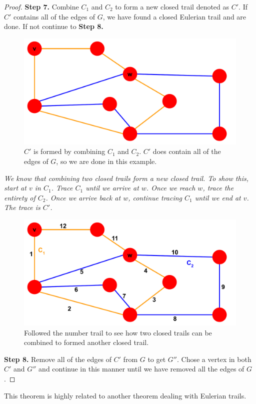 \documentclass[10pt]{amsart}
\begin{document}
\begin{proof}
    \noindent
    \textbf{Step 7.} Combine $C_1$ and $C_2$ to form a new closed trail denoted as $C'$. If $C'$
    contains all of the edges of $G$, we have found a closed Eulerian trail and are done. If not 
    continue to \textbf{Step 8.}

    \begin{figure}[h!]
        \centerline{
        {\includegraphics[width=.5\textwidth]{pictures/C'.pdf}}}
        \caption{$C'$ is formed by combining $C_1$ and $C_2$. $C'$ does contain all of the edges of
        $G$, so we are done in this example.}\label{C'}
    \end{figure} 

    \noindent \emph{
        We know that combining two closed trails form a new closed trail. To show this, start at $v$
        in $C_1$. Trace $C_1$ until we arrive at $w$. Once we reach $w$, trace the entirety of $C_2$.
        Once we arrive back at $w$, continue tracing $C_1$ until we end at $v$. The trace is $C'$.
    }

    \begin{figure}[h!]
        \centerline{
        {\includegraphics[width=.5\textwidth]{pictures/c'_traversal.pdf}}}
        \caption{Followed the number trail to see how two closed trails can be combined to formed
        another closed trail.}\label{C_traverse}
    \end{figure} 

    \noindent
    \textbf{Step 8.} Remove all of the edges of $C'$ from $G$ to get $G''$. Chose a vertex in both
    $C'$ and $G''$ and continue in this manner until we have removed all the edges of $G$.

    \noindent    
\end{proof}

This theorem is highly related to another theorem dealing with Eulerian trails.
\end{document}
